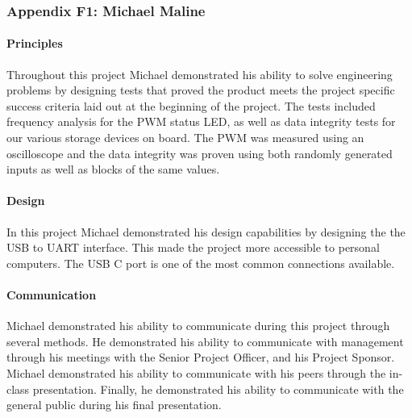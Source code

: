 \documentclass[../../main.tex]{subfiles}
\begin{document}
\subsubsection{Appendix F1: Michael Maline}

\paragraph{Principles}
Throughout this project Michael demonstrated his ability to solve engineering problems by designing tests that proved the product meets the project specific success criteria laid out at the beginning of the project. The tests included frequency analysis for the PWM status LED, as well as data integrity tests for our various storage devices on board. The PWM was measured using an oscilloscope and the data integrity was proven using both randomly generated inputs as well as blocks of the same values.

\paragraph{Design}
In this project Michael demonstrated his design capabilities by designing the the USB to UART interface. This made the project more accessible to personal computers. The USB C port is one of the most common connections available.

\paragraph{Communication}
Michael demonstrated his ability to communicate during this project through several methods. He demonstrated his ability to communicate with management through his meetings with the Senior Project Officer, and his Project Sponsor. Michael demonstrated his ability to communicate with his peers through the in-class presentation. Finally, he demonstrated his ability to communicate with the general public during his final presentation.

\end{document}

